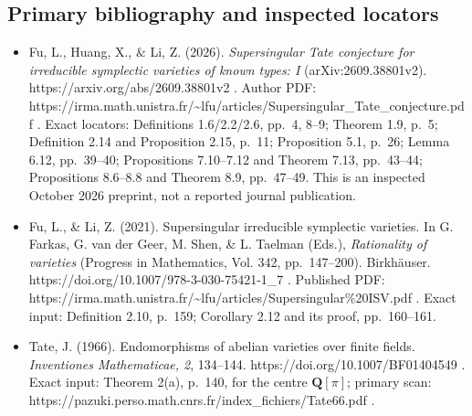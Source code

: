 \subsection{Primary bibliography and inspected
locators}\label{primary-bibliography-and-inspected-locators}

\begin{itemize}
\tightlist
\item
  Fu, L., Huang, X., \& Li, Z. (2026). \emph{Supersingular Tate
  conjecture for irreducible symplectic varieties of known types: I}
  (arXiv:2609.38801v2). https://arxiv.org/abs/2609.38801v2 . Author PDF:
  https://irma.math.unistra.fr/\textasciitilde lfu/articles/Supersingular\_Tate\_conjecture.pdf
  . Exact locators: Definitions 1.6/2.2/2.6, pp.~4, 8--9; Theorem 1.9,
  p.~5; Definition 2.14 and Proposition 2.15, p.~11; Proposition 5.1,
  p.~26; Lemma 6.12, pp.~39--40; Propositions 7.10--7.12 and Theorem
  7.13, pp.~43--44; Propositions 8.6--8.8 and Theorem 8.9, pp.~47--49.
  This is an inspected October 2026 preprint, not a reported journal
  publication.
\item
  Fu, L., \& Li, Z. (2021). Supersingular irreducible symplectic
  varieties. In G. Farkas, G. van der Geer, M. Shen, \& L. Taelman
  (Eds.), \emph{Rationality of varieties} (Progress in Mathematics, Vol.
  342, pp.~147--200). Birkhäuser.
  https://doi.org/10.1007/978-3-030-75421-1\_7 . Published PDF:
  https://irma.math.unistra.fr/\textasciitilde lfu/articles/Supersingular\%20ISV.pdf
  . Exact input: Definition 2.10, p.~159; Corollary 2.12 and its proof,
  pp.~160--161.
\item
  Tate, J. (1966). Endomorphisms of abelian varieties over finite
  fields. \emph{Inventiones Mathematicae, 2}, 134--144.
  https://doi.org/10.1007/BF01404549 . Exact input: Theorem 2(a),
  p.~140, for the centre \(\mathbf Q[\pi]\); primary scan:
  https://pazuki.perso.math.cnrs.fr/index\_fichiers/Tate66.pdf .
\end{itemize}
